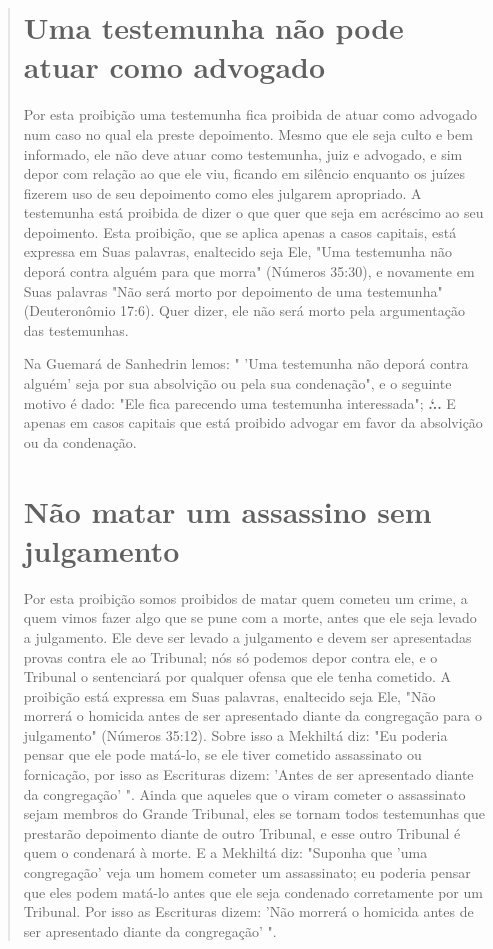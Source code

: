 \begin{quote}
\section{Uma testemunha não pode atuar como advogado}

Por esta proibição uma testemunha fica proibida de atuar como ad­vogado
num caso no qual ela preste depoimento. Mesmo que ele seja culto e bem
informado, ele não deve atuar como testemunha, juiz e advogado, e sim
depor com relação ao que ele viu, ficando em silêncio enquanto os juízes
fize­rem uso de seu depoimento como eles julgarem apropriado. A
testemunha está proibida de dizer o que quer que seja em acréscimo ao
seu depoimento. Esta proibição, que se aplica apenas a casos capitais,
está expressa em Suas palavras, enaltecido seja Ele, "Uma testemunha não
deporá contra alguém para que mor­ra" (Números 35:30), e novamente em
Suas palavras "Não será morto por de­poimento de uma testemunha"
(Deuteronômio 17:6). Quer dizer, ele não será morto pela argumentação
das testemunhas.

Na Guemará de Sanhedrin lemos: " 'Uma testemunha não deporá con­tra
alguém' seja por sua absolvição ou pela sua condenação", e o seguinte
moti­vo é dado: "Ele fica parecendo uma testemunha interessada";
\textbf{.`..} E apenas em casos
capitais que está proibido advogar em favor da absolvição ou da
condenação.

\section{Não matar um assassino sem julgamento}

Por esta proibição somos proibidos de matar quem cometeu um cri­me, a
quem vimos fazer algo que se pune com a morte, antes que ele seja levado
a julgamento. Ele deve ser levado a julgamento e devem ser apresentadas
provas contra ele ao Tribunal; nós só podemos depor contra ele, e o
Tribunal o senten­ciará por qualquer ofensa que ele tenha cometido. A
proibição está expressa em Suas palavras, enaltecido seja Ele, "Não
morrerá o homicida antes de ser apresen­tado diante da congregação para
o julgamento" (Números 35:12). Sobre isso a Mek­hiltá diz: "Eu poderia
pensar que ele pode matá-lo, se ele tiver cometido assassi­nato ou
fornicação, por isso as Escrituras dizem: 'Antes de ser apresentado
diante da congregação' ". Ainda que aqueles que o viram cometer o
assassinato sejam membros do Grande Tribunal, eles se tornam todos
testemunhas que prestarão depoimento diante de outro Tribunal, e esse
outro Tribunal é quem o condenará à morte. E a Mekhiltá diz: "Suponha
que 'uma congregação' veja um homem co­meter um assassinato; eu poderia
pensar que eles podem matá-lo antes que ele seja condenado corretamente
por um Tribunal. Por isso as Escrituras dizem: 'Não morrerá o homicida
antes de ser apresentado diante da congregação' ".


\end{quote}
